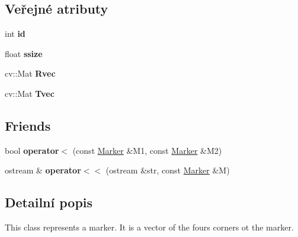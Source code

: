 \subsection*{Veřejné atributy}
\begin{DoxyCompactItemize}
\item 
\hypertarget{class_ar_pipe_1_1_marker_a33f4be78f79f38e54d9b657ea3b12a72}{int {\bfseries id}}\label{d4/dc2/class_ar_pipe_1_1_marker_a33f4be78f79f38e54d9b657ea3b12a72}

\item 
\hypertarget{class_ar_pipe_1_1_marker_a4135dc060acf0aadee9633926d870faf}{float {\bfseries ssize}}\label{d4/dc2/class_ar_pipe_1_1_marker_a4135dc060acf0aadee9633926d870faf}

\item 
\hypertarget{class_ar_pipe_1_1_marker_a4aff6ef505f82a731320ed11ef25ca32}{cv\-::\-Mat {\bfseries Rvec}}\label{d4/dc2/class_ar_pipe_1_1_marker_a4aff6ef505f82a731320ed11ef25ca32}

\item 
\hypertarget{class_ar_pipe_1_1_marker_aa8c712e71d4b0ac13d99c3bdb028fa81}{cv\-::\-Mat {\bfseries Tvec}}\label{d4/dc2/class_ar_pipe_1_1_marker_aa8c712e71d4b0ac13d99c3bdb028fa81}

\end{DoxyCompactItemize}
\subsection*{Friends}
\begin{DoxyCompactItemize}
\item 
\hypertarget{class_ar_pipe_1_1_marker_a19de3d60e4cd6ddaf3df606158049a0c}{bool {\bfseries operator$<$} (const \hyperlink{class_ar_pipe_1_1_marker}{Marker} \&M1, const \hyperlink{class_ar_pipe_1_1_marker}{Marker} \&M2)}\label{d4/dc2/class_ar_pipe_1_1_marker_a19de3d60e4cd6ddaf3df606158049a0c}

\item 
\hypertarget{class_ar_pipe_1_1_marker_a191f20f61955983c0475ae4b141657ef}{ostream \& {\bfseries operator$<$$<$} (ostream \&str, const \hyperlink{class_ar_pipe_1_1_marker}{Marker} \&M)}\label{d4/dc2/class_ar_pipe_1_1_marker_a191f20f61955983c0475ae4b141657ef}

\end{DoxyCompactItemize}


\subsection{Detailní popis}
This class represents a marker. It is a vector of the fours corners ot the marker. 



